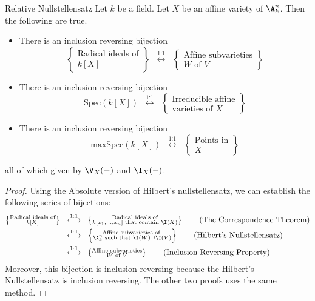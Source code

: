 \documentclass[a4paper]{article}
\begin{document}
\begin{thm}{Relative Nullstellensatz}{} Let $k$ be a field. Let $X$ be an affine variety of $\A_k^n$. Then the following are true. 
\begin{itemize}
\item There is an inclusion reversing bijection $$\left\{\substack{\text{Radical ideals of}\\ k[X]}\right\}\;\;\overset{\text{1:1}}{\longleftrightarrow}\;\;\left\{\substack{\text{Affine subvarieties}\\ W\text{ of }V}\right\}$$
\item There is an inclusion reversing bijection $$\text{Spec}(k[X])\;\;\overset{\text{1:1}}{\longleftrightarrow}\;\;\left\{\substack{\text{Irreducible affine}\\\text{varieties of }X}\right\}$$
\item There is an inclusion reversing bijection $$\text{maxSpec}(k[X])\;\;\overset{\text{1:1}}{\longleftrightarrow}\;\;\left\{\substack{\text{Points in}\\X}\right\}$$
\end{itemize} 
all of which given by $\V_X(-)$ and $\I_X(-)$. 
\begin{proof}
Using the Absolute version of Hilbert's nullstellensatz, we can establish the following series of bijections: 
\begin{align*}
\left\{\substack{\text{Radical ideals of}\\ k[X]}\right\}\;\;&\overset{\text{1:1}}{\longleftrightarrow}\;\;\left\{\substack{\text{Radical ideals of}\\ k[x_1,\dots,x_n]\text{ that contain }\I(X)}\right\}\tag{The Correspondence Theorem}\\
&\overset{\text{1:1}}{\longleftrightarrow}\;\;\left\{\substack{\text{Affine subvarieties of }\\ \A_k^n\text{ such that }\I(W)\supseteq\I(V)}\right\}\tag{Hilbert's Nullstellensatz}\\
&\overset{\text{1:1}}{\longleftrightarrow}\;\;\left\{\substack{\text{Affine subvarieties}\\ W\text{ of }V}\right\}\tag{Inclusion Reversing Property}\\
\end{align*}
Moreover, this bijection is inclusion reversing because the Hilbert's Nullstellensatz is inclusion reversing. The other two proofs uses the same method. 
\end{proof}
\end{thm}
\end{document}
